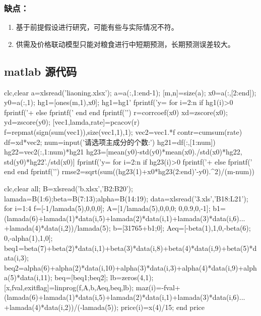 \documentclass[withoutpreface,bwprint]{cumcmthesis} %
\begin{document}
		\subsubsection{缺点：}\par
		\begin{enumerate}
		\item 基于前提假设进行研究，可能有些与实际情况不符。
		\item 供需及价格联动模型只能对粮食进行中短期预测，长期预测误差较大。
		\end{enumerate}

		
		


\newpage%
\begin{appendices}		
	\section{matlab 源代码}
	\begin{matlab}
	clc,clear
	a=xlsread('liaoning.xlsx'); 
	a=a(:,1:end-1);
	[m,n]=size(a);
	x0=a(:,[2:end]); y0=a(:,1); 
	hg1=[ones(m,1),x0]; 
	hg1=hg1' 
	fprintf('y=%
	for i=2:n
	    if hg1(i)>0  
	       fprintf('+%
	    else
	       fprintf('%
	    end
	end
	fprintf('\n')  
	r=corrcoef(x0)  
	xd=zscore(x0);  
	yd=zscore(y0);  
	[vec1,lamda,rate]=pcacov(r)
	f=repmat(sign(sum(vec1)),size(vec1,1),1); 
	vec2=vec1.*f 
	contr=cumsum(rate) 
	df=xd*vec2;  
	num=input('请选项主成分的个数:')   
	hg21=df(:,[1:num])\yd  
	hg22=vec2(:,1:num)*hg21  
	hg23=[mean(y0)-std(y0)*mean(x0)./std(x0)*hg22, std(y0)*hg22'./std(x0)]  
	fprintf('y=%
	for i=2:n
	    if hg23(i)>0
	        fprintf('+%
	    else
	        fprintf('%
	    end
	end
	fprintf('\n')
	rmse2=sqrt(sum((hg23(1)+x0*hg23(2:end)'-y0).^2)/(m-num)) 
	\end{matlab}
	
	\begin{matlab}
	clc,clear all;
	B=xlsread('b.xlsx','B2:B20');
	lamada=B(1:6);beta=B(7:13);alpha=B(14:19);
	data=xlsread('3.xls','B18:L21');
	for i=1:4
	    f=[-1/lamada(5),0,0,0];
	    A=[1/lamada(5),0,0,0;
	        0,0.9,0,-1];
	    b1=(lamada(6)+lamada(1)*data(i,5)+lamada(2)*data(i,1)+lamada(3)*data(i,6)...
	    +lamada(4)*data(i,2))/lamada(5);
	    b=[31765+b1;0];
	    Aeq=[-beta(1),1,0,-beta(6);
	        0,-alpha(1),1,0];
	    beq1=beta(7)+beta(2)*data(i,1)+beta(3)*data(i,8)+beta(4)*data(i,9)+beta(5)*data(i,3);
	    beq2=alpha(6)+alpha(2)*data(i,10)+alpha(3)*data(i,3)+alpha(4)*data(i,9)+alpha(5)*data(i,11);
	    beq=[beq1;beq2];
	    lb=zeros(4,1);
	    [x,fval,exitflag]=linprog(f,A,b,Aeq,beq,lb);
	    maz(i)=-fval+(lamada(6)+lamada(1)*data(i,5)+lamada(2)*data(i,1)+lamada(3)*data(i,6)...
	    +lamada(4)*data(i,2))/(-lamada(5));
	    price(i)=x(4)/15;
	end
	price
	\end{matlab}
	

\end{appendices}
\end{document}
